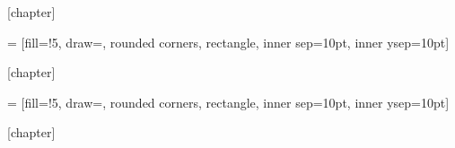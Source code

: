 [chapter]

 = [fill=!5,
draw=,
rounded corners,
rectangle, inner sep=10pt, inner ysep=10pt]

\newcommand{\defn}[2][]
{\stepcounter{defcounter}
	\setlength{\netlength}{\textwidth}
	\addtolength{\netlength}{-20pt}
	
	\bigskip\noindent
	\begin{tikzpicture}
	\node[dboxstyle] (dbox)
	{\begin{minipage}{\netlength}
		\ifthenelse{\equal{#1}{\empty}}{\smallskip}{\medskip}
		#2
		\end{minipage}
	};
	\node[inner ysep=0pt] at (dbox.north west) [anchor=west, xshift=2mm,  fill=white, text=\defcolorfill, top color=white, bottom color=\defcolorfill!5, rounded corners]
	{\textbf{\large Définition \arabic{defcounter}}
		\ifthenelse{\equal{#1}{\empty}}{}{{\large(#1)}}
	};
	\end{tikzpicture}
}

[chapter]

 = [fill=\checkboxfill!5,
draw=\checkboxborder,
rounded corners,
rectangle, inner sep=10pt, inner ysep=10pt]

\newcommand{\addCheckpoint}[2][]
{\stepcounter{checkboxcounter}
	\setlength{\netlength}{\textwidth}
	\addtolength{\netlength}{-20pt}
	
	\bigskip\noindent
	\begin{tikzpicture}
	\node[checkboxstyle] (dbox)
	{\begin{minipage}{\netlength}
		\ifthenelse{\equal{#1}{\empty}}{\smallskip}{\medskip}
		#2
		\end{minipage}
	};
	\node[inner ysep=0pt] at (dbox.north west) [anchor=west, xshift=2mm,  fill=white, text=\checkboxborder, top color=white, bottom color=\checkboxfill!5, rounded corners]
	{\textbf{\large Checkpoint \arabic{checkboxcounter}}
		\ifthenelse{\equal{#1}{\empty}}{}{{\large(#1)}}
	};
	\end{tikzpicture}
}

[chapter]

\newcommand{\addQuestion}[2][]
{\stepcounter{questioncounter}
	\setlength{\netlength}{\textwidth}
	\addtolength{\netlength}{-20pt}
	
	\bigskip\noindent
	\begin{tikzpicture}
	\node[checkboxstyle] (dbox)
	{\begin{minipage}{\netlength}
		\ifthenelse{\equal{#1}{\empty}}{\smallskip}{\medskip}
		#2
		\end{minipage}
	};
	\node[inner ysep=0pt] at (dbox.north west) [anchor=west, xshift=2mm,  fill=white, text=\checkboxborder, top color=white, bottom color=\checkboxfill!5, rounded corners]
	{\textbf{\large Question \arabic{questioncounter}}
		\ifthenelse{\equal{#1}{\empty}}{}{{\large(#1)}}
	};
	\end{tikzpicture}
}


